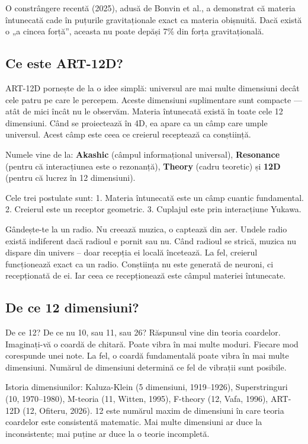 \documentclass[11pt,a4paper]{article}
\begin{document}
O constrângere recentă (2025), adusă de Bonvin et al., a demonstrat că materia întunecată cade în puțurile gravitaționale exact ca materia obișnuită. Dacă există o „a cincea forță”, aceasta nu poate depăși 7\% din forța gravitațională.

\subsection{Ce este ART-12D?}
ART-12D pornește de la o idee simplă: universul are mai multe dimensiuni decât cele patru pe care le percepem. Aceste dimensiuni suplimentare sunt compacte — atât de mici încât nu le observăm. Materia întunecată există în toate cele 12 dimensiuni. Când se proiectează în 4D, ea apare ca un câmp care umple universul. Acest câmp este ceea ce creierul receptează ca conștiință.

Numele vine de la: \textbf{Akashic} (câmpul informațional universal), \textbf{Resonance} (pentru că interacțiunea este o rezonanță), \textbf{Theory} (cadru teoretic) și \textbf{12D} (pentru că lucrez în 12 dimensiuni).

Cele trei postulate sunt: 1. Materia întunecată este un câmp cuantic fundamental. 2. Creierul este un receptor geometric. 3. Cuplajul este prin interacțiune Yukawa.

Gândește-te la un radio. Nu creează muzica, o captează din aer. Undele radio există indiferent dacă radioul e pornit sau nu. Când radioul se strică, muzica nu dispare din univers – doar recepția ei locală încetează. La fel, creierul funcționează exact ca un radio. Conștiința nu este generată de neuroni, ci recepționată de ei. Iar ceea ce recepționează este câmpul materiei întunecate.

\subsection{De ce 12 dimensiuni?}
De ce 12? De ce nu 10, sau 11, sau 26? Răspunsul vine din teoria coardelor. Imaginați-vă o coardă de chitară. Poate vibra în mai multe moduri. Fiecare mod corespunde unei note. La fel, o coardă fundamentală poate vibra în mai multe dimensiuni. Numărul de dimensiuni determină ce fel de vibrații sunt posibile.

Istoria dimensiunilor: Kaluza-Klein (5 dimensiuni, 1919–1926), Superstringuri (10, 1970–1980), M-teoria (11, Witten, 1995), F-theory (12, Vafa, 1996), ART-12D (12, Ofiteru, 2026). 12 este numărul maxim de dimensiuni în care teoria coardelor este consistentă matematic. Mai multe dimensiuni ar duce la inconsistente; mai puține ar duce la o teorie incompletă.
\end{document}

